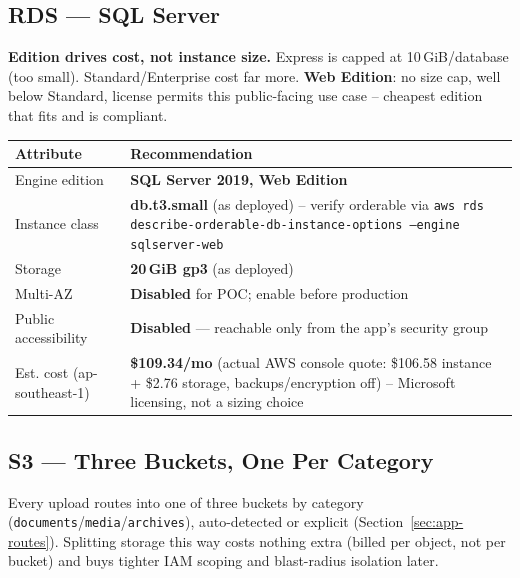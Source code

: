 \documentclass[10pt]{article}
\begin{document}
\subsection{RDS --- SQL Server}

\begin{warnbox}
\textbf{Edition drives cost, not instance size.} Express is capped at
10\,GiB/database (too small). Standard/Enterprise cost far more.
\textbf{Web Edition}: no size cap, well below Standard, license permits this
public-facing use case -- cheapest edition that fits and is compliant.
\end{warnbox}

\noindent \begin{tabularx}{\textwidth}{@{}l X@{}}
\toprule
\rowcolor{tableHead} \textbf{Attribute} & \textbf{Recommendation} \\
\midrule
Engine edition & \textbf{SQL Server 2019, Web Edition} \\
\rowcolor{tableAlt} Instance class & \textbf{db.t3.small} (as deployed) -- verify orderable via \texttt{aws rds describe-orderable-db-instance-options --engine sqlserver-web} \\
Storage & \textbf{20\,GiB gp3} (as deployed) \\
\rowcolor{tableAlt} Multi-AZ & \textbf{Disabled} for POC; enable before production \\
Public accessibility & \textbf{Disabled} --- reachable only from the app's security group \\
\rowcolor{tableAlt} Est. cost (ap-southeast-1) & \textbf{\$109.34/mo} (actual AWS console quote: \$106.58 instance + \$2.76 storage, backups/encryption off) -- Microsoft licensing, not a sizing choice \\
\bottomrule
\end{tabularx}

\subsection{S3 --- Three Buckets, One Per Category}

Every upload routes into one of three buckets by category
(\texttt{documents}/\texttt{media}/\texttt{archives}), auto-detected or
explicit (Section~\ref{sec:app-routes}). Splitting storage this way costs
nothing extra (billed per object, not per bucket) and buys tighter IAM
scoping and blast-radius isolation later.
\end{document}
